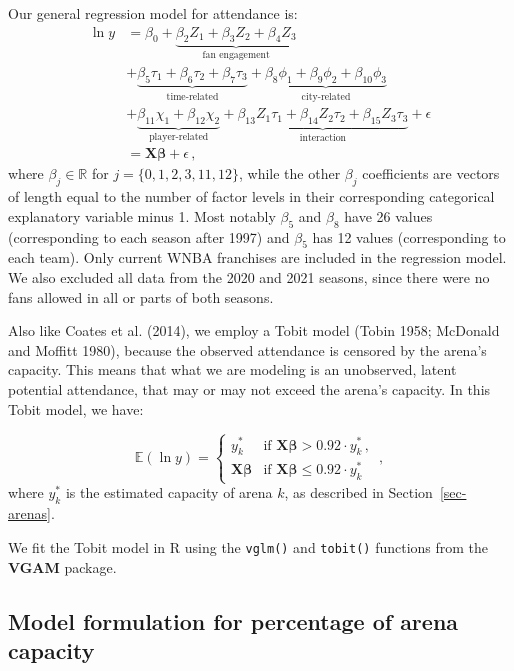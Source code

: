 \documentclass[
  letterpaper,
  DIV=11,
  numbers=noendperiod]{scrartcl}
\begin{document}
Our general regression model for attendance is: \begin{align*}
  \ln{y} &= \beta_0 + \underbrace{\beta_2 Z_1 + \beta_3 Z_2 + \beta_4 Z_3}_{\text{fan engagement}} \\
    &+ \underbrace{\beta_5 \tau_1 + \beta_6 \tau_2 + \beta_7 \tau_3}_{\text{time-related}} + \underbrace{\beta_8 \phi_1 + \beta_9 \phi_2 + \beta_{10} \phi_3}_{\text{ city-related }} \\
    &+ \underbrace{\beta_{11} \chi_1 + \beta_{12} \chi_2}_{\text{player-related}} + \underbrace{\beta_{13} Z_1 \tau_1 + \beta_{14} Z_2 \tau_2 + \beta_{15} Z_3 \tau_3}_{\text{interaction}} + \epsilon \\
    &= \symbf{X} \symbf{\beta} + \epsilon \,,
\end{align*} where \(\beta_j \in \mathbb{R}\) for
\(j = \{0, 1, 2, 3, 11, 12\}\), while the other \(\beta_j\) coefficients
are vectors of length equal to the number of factor levels in their
corresponding categorical explanatory variable minus 1. Most notably
\(\beta_5\) and \(\beta_8\) have 26 values (corresponding to each season
after 1997) and \(\beta_5\) has 12 values (corresponding to each team).
Only current WNBA franchises are included in the regression model. We
also excluded all data from the 2020 and 2021 seasons, since there were
no fans allowed in all or parts of both seasons.

Also like Coates et al. (2014), we employ a Tobit model (Tobin 1958;
McDonald and Moffitt 1980), because the observed attendance is censored
by the arena's capacity. This means that what we are modeling is an
unobserved, latent potential attendance, that may or may not exceed the
arena's capacity. In this Tobit model, we have:

\[
  \mathbb{E}(\ln{y}) = \begin{cases} y^*_k & \text{if } \symbf{X} \symbf{\beta} > 0.92 \cdot y^*_k \,, \\
                         \symbf{X} \symbf{\beta} & \text{if } \symbf{X} \symbf{\beta} \leq 0.92 \cdot y^*_k
                         \end{cases} \,,
\] where \(y^*_k\) is the estimated capacity of arena \(k\), as
described in Section~\ref{sec-arenas}.

We fit the Tobit model in R using the \texttt{vglm()} and
\texttt{tobit()} functions from the \textbf{VGAM} package.

\subsection{Model formulation for percentage of arena
capacity}\label{sec-mod-cap}
\end{document}
